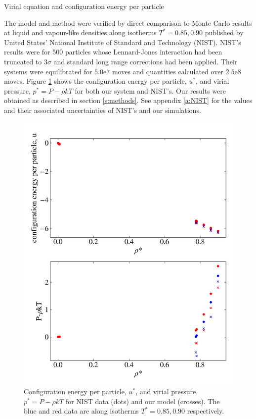 \documentclass[10pt, twocolumn]{revtex4}    %
\begin{document}
Virial equation and configuration energy per particle


The model and method were verified by direct comparison to Monte Carlo results at liquid and vapour-like densities along isotherms $T^{*}=0.85, 0.90$ published by United States' National Institute of Standard and Technology (NIST). NIST's results were for 500 particles whose Lennard-Jones interaction had been truncated to $3\sigma{}$ and standard long range corrections had been applied. Their systems were equilibrated for $5.0\text{e}7$ moves and quantities calculated over $2.5\text{e}8$ moves. Figure \ref{fig:NIST_comparison} shows the configuration energy per particle, $u^*$, and virial pressure, $p^{*} = P - \rho{}kT$ for both our system and NIST's. Our results were obtained as described in section \ref{s:methods}. See appendix \ref{a:NIST} for the values and their associated uncertainties of NIST's and our simulations.

\begin{figure}
	\includegraphics[width=\linewidth]{figures/NISTcomparison.png}
	\caption{Configuration energy per particle, $u^*$, and virial pressure, $p^{*} = P - \rho{}kT$ for NIST data (dots) and our model (crosses). The blue and red data are along isotherms $T^{*} = 0.85, 0.90$ respectively.}
	\label{fig:NIST_comparison}
\end{figure}
\end{document}
